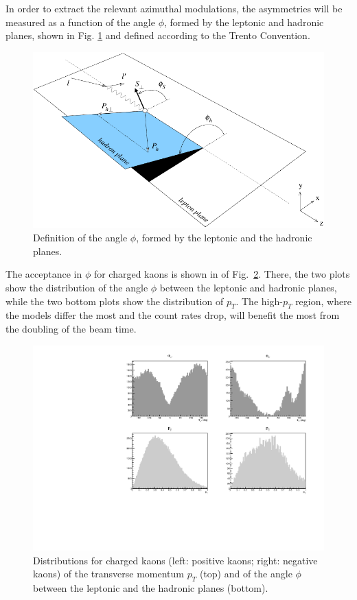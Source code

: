 In order to extract the relevant azimuthal modulations, the asymmetries will be measured as a function of the angle $\phi$, formed by the leptonic and hadronic planes, shown in Fig. \ref{fig::phi_angle} and defined according to the Trento Convention.
%
%
\begin{figure}
\centering
\includegraphics[width=1.0\textwidth]{sidis/anglestrento.pdf}
\caption{\label{fig::phi_angle} Definition of the angle $\phi$, formed by the leptonic and the hadronic planes.}
\end{figure}
%
The acceptance in $\phi$ for charged kaons is shown in of Fig.~\ref{fig::phi_pt_kpm}. There, the two plots show the distribution of the angle $\phi$ between the leptonic and hadronic planes, while the two bottom plots show the distribution of $p_T$. The high-$p_T$ region, where the models differ the most and the count rates drop, will benefit the most from the doubling of the beam time. 
%
%
\begin{figure}
\centering
\includegraphics[width=1.0\textwidth]{sidis/phi_pt_kpm.pdf}
\caption{\label{fig::phi_pt_kpm} Distributions for charged kaons (left: positive kaons; right: negative kaons) of the transverse momentum $p_T$ (top) and of the angle $\phi$ between the leptonic and the hadronic planes (bottom).}
\end{figure}
%
%
%
